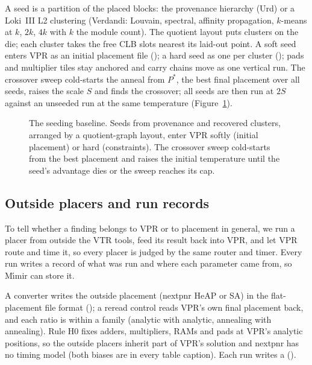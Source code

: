  A seed is a partition of the placed blocks: the provenance hierarchy (Urd) or a Loki~III L2 clustering (Verdandi: Louvain, spectral, affinity propagation, $k$-means at $k$, $2k$, $4k$ with $k$ the module count). The quotient layout puts clusters on the die; each cluster takes the free CLB slots nearest its laid-out point. A soft seed enters VPR as an initial placement file (); a hard seed as one  per cluster (); pads and multiplier tiles stay anchored and carry chains move as one vertical run. The crossover sweep cold-starts the anneal from $P^*$, the best final placement over all seeds, raises the scale $S$ and finds the crossover; all seeds are then run at $2S$ against an unseeded run at the same temperature (Figure~\ref{fig:norns}).

\begin{figure}[t]
\centering
\odinfit{\columnwidth}{}
\caption{The seeding baseline. Seeds from provenance and recovered clusters, arranged by a quotient-graph layout, enter VPR softly (initial placement) or hard (constraints). The crossover sweep cold-starts from the best placement and raises the initial temperature until the seed's advantage dies or the sweep reaches its cap.}
\label{fig:norns}
\end{figure}

\subsection{Outside placers and run records}
\label{sec:i-tools}

 To tell whether a finding belongs to VPR or to placement in general, we run a placer from outside the VTR tools, feed its result back into VPR, and let VPR route and time it, so every placer is judged by the same router and timer. Every run writes a record of what was run and where each parameter came from, so M\'{\i}mir can store it.

 A converter writes the outside placement (nextpnr HeAP or SA) in the flat-placement file format (); a reread control reads VPR's own final placement back, and each ratio is within a family (analytic with analytic, annealing with annealing). Rule H0 fixes adders, multipliers, RAMs and pads at VPR's analytic positions, so the outside placers inherit part of VPR's solution and nextpnr has no timing model (both biases are in every table caption). Each run writes a  ().

